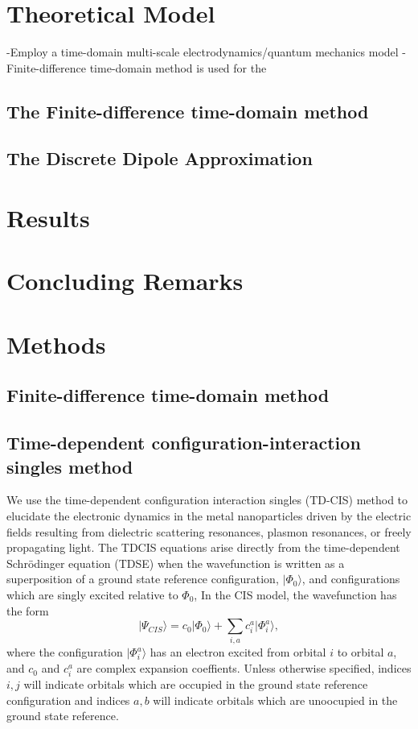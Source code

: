 \documentclass[journal=jacsat,manuscript=article]{achemso}
\begin{document}
\section{Theoretical Model}
-Employ a time-domain multi-scale electrodynamics/quantum mechanics model 
	- Finite-difference time-domain method is used for the 

\subsection{The Finite-difference time-domain method}


\subsection{The Discrete Dipole Approximation}


\section{Results}


\section{Concluding Remarks}

\section{Methods}

\subsection{Finite-difference time-domain method}

\subsection{Time-dependent configuration-interaction singles method}
We use the time-dependent configuration interaction singles (TD-CIS) method to elucidate the
electronic dynamics in the metal nanoparticles driven by the electric fields resulting from 
dielectric scattering resonances, plasmon resonances, or freely propagating light.  
The TDCIS equations arise directly from the time-dependent Schr\"odinger equation (TDSE) when the wavefunction
is written as a superposition of a ground state reference configuration, $|\Phi_0\rangle$, and configurations which are singly excited relative
to $\Phi_0$,  In the CIS model, the wavefunction has the form
\begin{equation}
|\Psi_{CIS}\rangle = c_0 |\Phi_0 \rangle + \sum_{i,a} c_i^a |\Phi_i^a\rangle,
\end{equation}
where the configuration $|\Phi_i^a\rangle$ has an electron excited from orbital $i$ to orbital $a$, 
and $c_0$ and $c_i^a$ are complex expansion coeffients.  Unless otherwise specified, indices $i, j$ will indicate
orbitals which are occupied in the ground state reference configuration and indices $a, b$ will indicate orbitals
which are unoocupied in the ground state reference.
\end{document}
